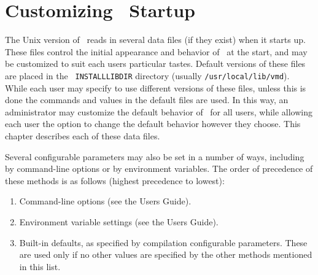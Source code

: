 
%
%
%


\section{Customizing \VMD\ Startup}

The Unix version of \VMD\ reads in several data files (if they exist) 
when it starts up.
These files control the initial appearance and behavior of \VMD\ at
the start, and may be customized to suit each users particular tastes.
Default versions of these files are placed in the {\tt
INSTALLLIBDIR} directory (usually {\tt /usr/local/lib/vmd}). 
While each user may specify to use different versions of these files,
unless this is done the commands and values in the default files are
used.  In this way, an administrator may customize the default
behavior of \VMD\ for all users, while allowing each user the option
to change the default behavior however they choose.  This chapter
describes each of these data files.

Several configurable parameters may also be set in a number of ways, including by command-line options or by environment variables.  The order of precedence of these methods is as follows (highest precedence to lowest):
\begin{enumerate}
  \item Command-line options (see the Users Guide).
  \item Environment variable settings (see the Users Guide).
  \item Built-in defaults, as specified by compilation configurable parameters.
        These are used only if no other values are specified by the other 
        methods mentioned in this list.
\end{enumerate}

